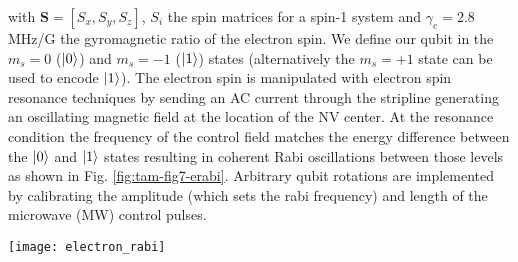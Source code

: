 with $\mathbf{S} =[S_x,S_y,S_z]$,  $S_i$ the spin matrices for a spin-1 system and $\gamma_e = 2.8$ MHz/G the gyromagnetic ratio of the electron spin. We define our qubit in the $m_s = 0$ ($\left|0\right>$) and $m_s = -1$ ($\left|1\right>$) states (alternatively the $m_s = + 1$ state can be used to encode $\left|1\right>$). The electron spin is manipulated with electron spin resonance techniques by sending an AC current through the stripline generating an oscillating magnetic field at the location of the NV center. At the resonance condition the frequency of the control field matches the energy difference between the $\left|0\right>$ and $\left|1\right>$ states resulting in coherent Rabi oscillations between those levels as shown in Fig. \ref{fig:tam-fig7-erabi}. Arbitrary qubit rotations are implemented by calibrating the amplitude (which sets the rabi frequency) and length of the microwave (MW) control pulses.

\label{sec:groundstatecontrol}
\begin{figure*}
	\centering
	\texttt{[image: electron\_rabi]}
	\caption{\label{fig:tam-fig7-erabi} \textbf{Electron spin manipulation and coherence.} (a) Coherent qubit rotations of the electron spin are performed by varying the length of a MW pulse. Solid line is a sinusoidal fit from which we determine the Rabi frequency $(7.67 \pm 0.02)$ MHz. (b) Ramsey measurements for two different NV centers where the wait time between two $\pi$/2 pulses is varied. From a fit to equation \ref{eq:tam-ramsey} we find $T_2^{*} = (0.96 \pm 0.03)$ and $(3.09 \pm 0.05)$ $\mu$s for the upper and lower panel respectively. The coupling to the nitrogen spin is $A_{\parallel} = (2.20 \pm 0.01)$ and $(2.195 \pm 0.002)$ MHz. For the bottom panel two additional frequency components are included in the fit to account for the strongly coupled $^{13}$C. We find a coupling strength of ($384 \pm 3$) kHz.  All datapoints are corrected to account for imperfect readout and initialization.}
\end{figure*}



